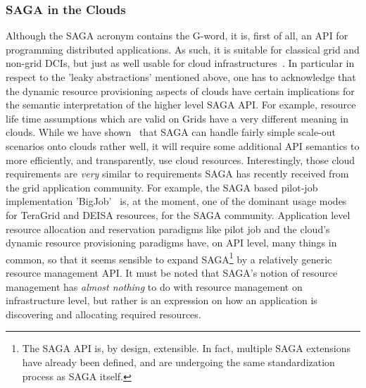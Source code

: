 \documentclass[10pt,conference,final,letterpaper,twoside,twocolumn,]{IEEEtran}
\newcommand{\I}[1]{\textit{#1}}
\begin{document}
 \subsubsection*{SAGA in the Clouds}

  Although the SAGA acronym contains the G-word, it is, first of all, an
  API for programming distributed applications.  As such, it is
  suitable for classical grid and non-grid DCIs, but just as well
  usable for cloud infrastructures~\cite{sagacloud...}.  In particular
  in respect to the 'leaky abstractions' mentioned above, one has to
  acknowledge that the dynamic resource provisioning aspects of clouds
  have certain implications for the semantic interpretation of the
  higher level SAGA API.  For example, resource life time assumptions
  which are valid on Grids have a very different meaning in clouds.
  While we have shown~\cite{sagacloud...} that SAGA can handle fairly
  simple scale-out scenarios onto clouds rather well, it will require
  some additional API semantics to more efficiently, and
  transparently, use cloud resources.  Interestingly, those cloud
  requirements are \I{very} similar to requirements SAGA has recently
  received from the grid application community.  For example,
  the SAGA based pilot-job implementation 'BigJob'~\cite{bigjob} is,
  at the moment, one of the dominant usage modes for TeraGrid and
  DEISA resources, for the SAGA community.  Application level resource
  allocation and reservation paradigms like pilot job and the cloud's
  dynamic resource provisioning paradigms have, on API level, many
  things in common, so that it seems sensible to expand
  SAGA\footnote{The SAGA API is, by design, extensible.  In fact,
  multiple SAGA extensions have already been defined, and are
  undergoing the same standardization process as SAGA itself.} by a
  relatively generic resource management API.  It must be noted that
  SAGA's notion of resource management has \I{almost nothing} to do
  with resource management on infrastructure level, but rather is an
  expression on how an application is discovering and allocating
  required resources.
  

\end{document}

